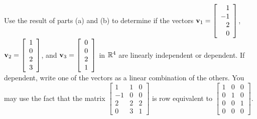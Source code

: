 \begin{activity}
	\item Use the result of parts (a) and (b) to determine if the vectors $\mathbf{v}_1 = \left[ \begin{array}{r} 1 \\ -1 \\ 2 \\ 0 \end{array} \right]$, $\mathbf{v}_2 = \left[ \begin{array}{c} 1 \\ 0 \\ 2 \\ 3 \end{array} \right]$, and $\mathbf{v}_3 = \left[ \begin{array}{c} 0 \\ 0 \\ 2 \\ 1 \end{array} \right]$ in $\mathbb{R}^4$ are linearly independent or dependent. If dependent, write one of the vectors as a linear combination of the others. You may use the fact that the matrix $\left[ \begin{array}{rcc} 1&1&0 \\ -1&0&0 \\ 2&2&2 \\ 0&3&1 \end{array} \right]$ is row equivalent to $\left[ \begin{array}{rcc} 1&0&0 \\ 0&1&0 \\ 0&0&1 \\ 0&0&0 \end{array} \right]$.



\ea

\end{activity}

\label{sec:min_span_set}

